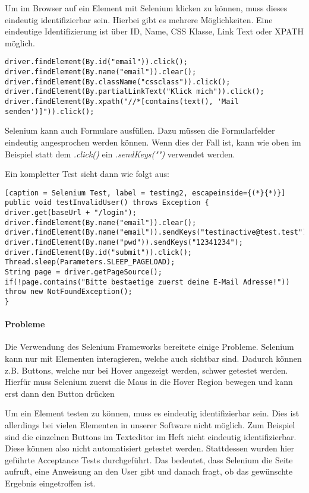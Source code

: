 Um im Browser auf ein Element mit Selenium klicken zu können, muss dieses eindeutig identifizierbar sein. Hierbei gibt es mehrere Möglichkeiten. Eine eindeutige Identifizierung ist über ID, Name, CSS Klasse, Link Text oder XPATH möglich. 

\begin{lstlisting}[caption = Selenium Element Selektoren, label = testing1]
driver.findElement(By.id("email")).click();
driver.findElement(By.name("email")).clear();
driver.findElement(By.className("cssclass")).click();
driver.findElement(By.partialLinkText("Klick mich")).click();
driver.findElement(By.xpath("//*[contains(text(), 'Mail senden')]")).click();
\end{lstlisting}

Selenium kann auch Formulare ausfüllen. Dazu müssen die Formularfelder eindeutig angesprochen werden können. Wenn dies der Fall ist, kann wie oben im Beispiel statt dem \textit{.click()} ein \textit{.sendKeys("")} verwendet werden. 

\newpage

Ein kompletter Test sieht dann wie folgt aus:
\begin{lstlisting}[caption = Selenium Test, label = testing2, escapeinside={(*}{*)}]
public void testInvalidUser() throws Exception {
driver.get(baseUrl + "/login");
driver.findElement(By.name("email")).clear();
driver.findElement(By.name("email")).sendKeys("testinactive@test.test");
driver.findElement(By.name("pwd")).sendKeys("12341234");
driver.findElement(By.id("submit")).click();
Thread.sleep(Parameters.SLEEP_PAGELOAD);
String page = driver.getPageSource();
if(!page.contains("Bitte bestaetige zuerst deine E-Mail Adresse!")) throw new NotFoundException();
}
\end{lstlisting}

\paragraph{Probleme}
Die Verwendung des Selenium Frameworks bereitete einige Probleme. Selenium kann nur mit Elementen interagieren, welche auch sichtbar sind. Dadurch können z.B. Buttons, welche nur bei Hover angezeigt werden, schwer getestet werden. Hierfür muss Selenium zuerst die Maus in die Hover Region bewegen und kann erst dann den Button drücken 

Um ein Element testen zu können, muss es eindeutig identifizierbar sein. Dies ist allerdings bei vielen Elementen in unserer Software nicht möglich. Zum Beispiel sind die einzelnen Buttons im Texteditor im Heft nicht eindeutig identifizierbar. Diese können also nicht automatisiert getestet werden. Stattdessen wurden hier geführte Acceptance Tests durchgeführt. Das bedeutet, dass Selenium die Seite aufruft, eine Anweisung an den User gibt und danach fragt, ob das gewünschte Ergebnis eingetroffen ist. 

